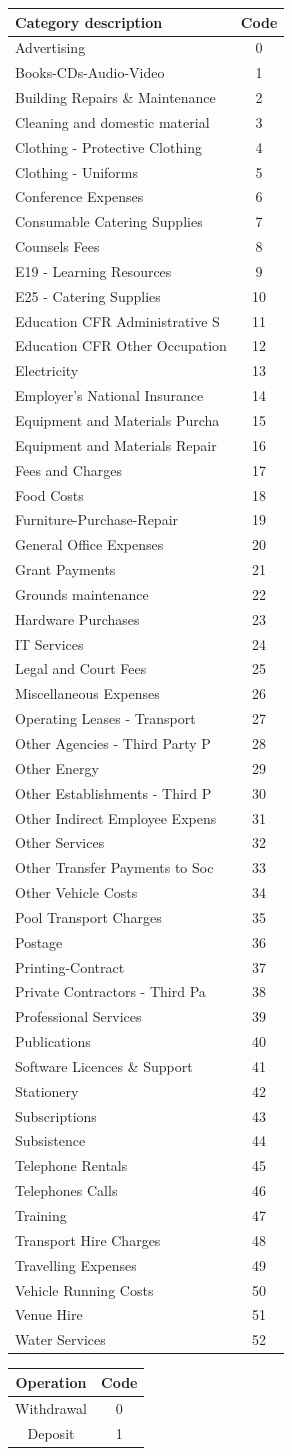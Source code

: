 \documentclass[]{article}
\begin{document}
\begin{longtable}[]{@{}lc@{}}
\toprule
Category description & Code\tabularnewline
\midrule
\endhead
Advertising & 0\tabularnewline
Books-CDs-Audio-Video & 1\tabularnewline
Building Repairs \& Maintenance & 2\tabularnewline
Cleaning and domestic material & 3\tabularnewline
Clothing - Protective Clothing & 4\tabularnewline
Clothing - Uniforms & 5\tabularnewline
Conference Expenses & 6\tabularnewline
Consumable Catering Supplies & 7\tabularnewline
Counsels Fees & 8\tabularnewline
E19 - Learning Resources & 9\tabularnewline
E25 - Catering Supplies & 10\tabularnewline
Education CFR Administrative S & 11\tabularnewline
Education CFR Other Occupation & 12\tabularnewline
Electricity & 13\tabularnewline
Employer's National Insurance & 14\tabularnewline
Equipment and Materials Purcha & 15\tabularnewline
Equipment and Materials Repair & 16\tabularnewline
Fees and Charges & 17\tabularnewline
Food Costs & 18\tabularnewline
Furniture-Purchase-Repair & 19\tabularnewline
General Office Expenses & 20\tabularnewline
Grant Payments & 21\tabularnewline
Grounds maintenance & 22\tabularnewline
Hardware Purchases & 23\tabularnewline
IT Services & 24\tabularnewline
Legal and Court Fees & 25\tabularnewline
Miscellaneous Expenses & 26\tabularnewline
Operating Leases - Transport & 27\tabularnewline
Other Agencies - Third Party P & 28\tabularnewline
Other Energy & 29\tabularnewline
Other Establishments - Third P & 30\tabularnewline
Other Indirect Employee Expens & 31\tabularnewline
Other Services & 32\tabularnewline
Other Transfer Payments to Soc & 33\tabularnewline
Other Vehicle Costs & 34\tabularnewline
Pool Transport Charges & 35\tabularnewline
Postage & 36\tabularnewline
Printing-Contract & 37\tabularnewline
Private Contractors - Third Pa & 38\tabularnewline
Professional Services & 39\tabularnewline
Publications & 40\tabularnewline
Software Licences \& Support & 41\tabularnewline
Stationery & 42\tabularnewline
Subscriptions & 43\tabularnewline
Subsistence & 44\tabularnewline
Telephone Rentals & 45\tabularnewline
Telephones Calls & 46\tabularnewline
Training & 47\tabularnewline
Transport Hire Charges & 48\tabularnewline
Travelling Expenses & 49\tabularnewline
Vehicle Running Costs & 50\tabularnewline
Venue Hire & 51\tabularnewline
Water Services & 52\tabularnewline
\bottomrule
\end{longtable}

\begin{longtable}[]{@{}cc@{}}
\toprule
Operation & Code\tabularnewline
\midrule
\endhead
Withdrawal & 0\tabularnewline
Deposit & 1\tabularnewline
\bottomrule
\end{longtable}
\end{document}
